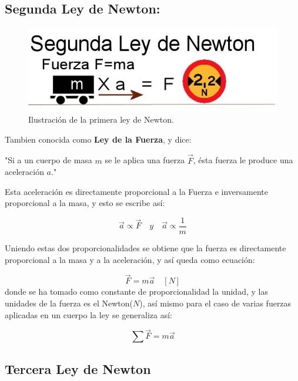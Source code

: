 \documentclass[a5paper,pagesize,10pt,bibtotoc,pointlessnumbers,
normalheadings,DIV=9,fleqn,x11names,table,twoside=false]{scrbook}
\begin{document}
\subsection{Segunda Ley de Newton:}

\begin{figure}[ht]
 \centering
 \includegraphics[scale=0.5]{images/segunda-ley-de-newton.jpg}
 \caption{Ilustración de la primera ley de Newton.}\label{ac}
\end{figure} 

Tambien conocida como \textbf{Ley de la Fuerza}, y dice:

\begin{tcolorbox}
"Si a un cuerpo de masa $m$ se le aplica una fuerza $\vec{F}$, ésta fuerza le produce una aceleración $a$."
\end{tcolorbox}

Esta aceleración es directamente proporcional a la Fuerza e inversamente proporcional a la masa, y esto se escribe así:

\begin{equation}
\vec{a} \propto \vec{F} \quad y \quad \vec{a} \propto \frac{1}{m}
\end{equation}

Uniendo estas dos proporcionalidades se obtiene que la fuerza es directamente proporcional a la masa y a la aceleración, y así 
queda como ecuación:

\begin{equation}
\vec{F} = m\vec{a} \quad [N]
\end{equation}
donde se ha tomado como constante de proporcionalidad la unidad, y las unidades de la fuerza es el Newton($N$), así mismo para el 
caso de varias fuerzas aplicadas en un cuerpo la ley se generaliza así:

\begin{equation}
\sum \vec{F} = m\vec{a}
\end{equation} 

\subsection{Tercera Ley de Newton}
\end{document}
